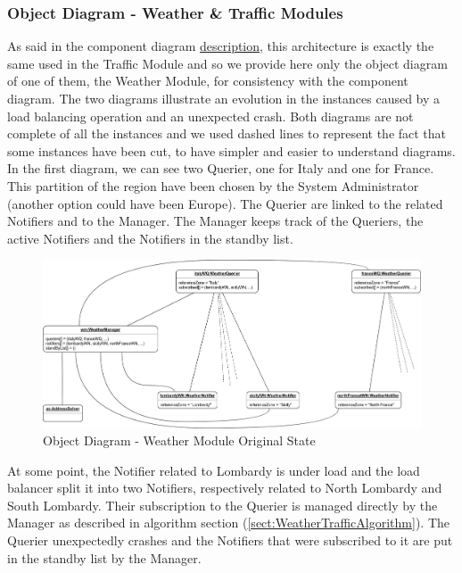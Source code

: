 	\subsubsection{Object Diagram - Weather \& Traffic Modules}
		As said in the component diagram \hyperref[sect:WeatherTrafficModules]{description}, this architecture is exactly the same used in the Traffic Module and so we provide here only the object diagram of one of them, the Weather Module, for consistency with the component diagram.\newline
		The two diagrams illustrate an evolution in the instances caused by a load balancing operation and an unexpected crash. Both diagrams are not complete of all the instances and we used dashed lines to represent the fact that some instances have been cut, to have simpler and easier to understand diagrams.\newline
		In the first diagram, we can see two Querier, one for Italy and one for France. This partition of the region have been chosen by the System Administrator (another option could have been Europe). The Querier are linked to the related Notifiers and to the Manager. The Manager keeps track of the Queriers, the active Notifiers and the Notifiers in the standby list.
		\begin{figure}[H]
			\centerline{\includegraphics[width=0.9\paperwidth]{Images/OD_WeatherModule_Before}}
			\caption{Object Diagram - Weather Module Original State}
		\end{figure}
		\noindent
		At some point, the Notifier related to Lombardy is under load and the load balancer split it into two Notifiers, respectively related to North Lombardy and South Lombardy. Their subscription to the Querier  is managed directly by the Manager as described in algorithm section (\ref{sect:WeatherTrafficAlgorithm}).\newline
		The  Querier unexpectedly crashes and the Notifiers that were subscribed to it are put in the standby list by the Manager.\newline
